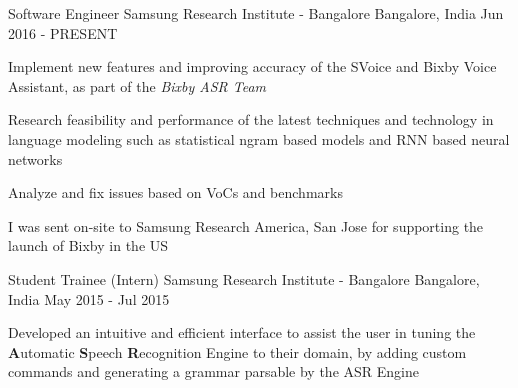 

\begin{cventries}

  \cventry
    {Software Engineer} %
    {Samsung Research Institute - Bangalore} %
    {Bangalore, India} %
    {Jun 2016 - PRESENT} %
    {
      \begin{cvitems}
      \item{Implement new features and improving accuracy of the SVoice and Bixby Voice Assistant, as part of the \textit{Bixby ASR Team}}
      \item{Research feasibility and performance of the latest techniques and technology in language modeling such as statistical ngram based models and RNN based neural networks}
      \item{Analyze and fix issues based on VoCs and benchmarks}
      \item{I was sent on-site to Samsung Research America, San Jose for supporting the launch of Bixby in the US}
      \end{cvitems}
    }

  \cventry
    {Student Trainee (Intern)} %
    {Samsung Research Institute - Bangalore} %
    {Bangalore, India} %
    {May 2015 - Jul 2015} %
    {
      \begin{cvitems}
      \item{Developed an intuitive and efficient interface to assist the user in tuning the \textbf{A}utomatic  \textbf{S}peech \textbf{R}ecognition Engine to their domain, by adding custom commands and generating a grammar parsable by the ASR  Engine}
      \end{cvitems}
    }


\end{cventries}
